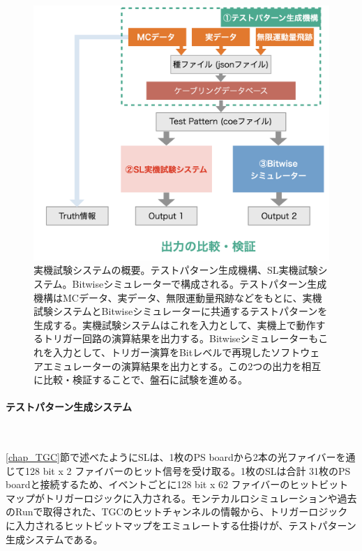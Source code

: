 \begin{figure} 
\centering
\includegraphics[width=16cm]{fig/Test/Test_system.png}
\caption[実機試験システムの概要]{実機試験システムの概要。テストパターン生成機構、SL実機試験システム。Bitwiseシミュレーターで構成される。テストパターン生成機構はMCデータ、実データ、無限運動量飛跡などをもとに、実機試験システムとBitwiseシミュレーターに共通するテストパターンを生成する。実機試験システムはこれを入力として、実機上で動作するトリガー回路の演算結果を出力する。Bitwiseシミュレーターもこれを入力として、トリガー演算をBitレベルで再現したソフトウェアエミュレーターの演算結果を出力とする。この2つの出力を相互に比較・検証することで、盤石に試験を進める。}
\label{Test_system}
\end{figure}

\paragraph{テストパターン生成システム}　　
\par
\ref{chap_TGC}節で述べたようにSLは、1枚のPS boardから2本の光ファイバーを通じて128 bit x 2 ファイバーのヒット信号を受け取る。1枚のSLは合計 31枚のPS boardと接続するため、イベントごとに128 bit x 62 ファイバーのヒットビットマップがトリガーロジックに入力される。モンテカルロシミュレーションや過去のRunで取得された、TGCのヒットチャンネルの情報から、トリガーロジックに入力されるヒットビットマップをエミュレートする仕掛けが、テストパターン生成システムである。

